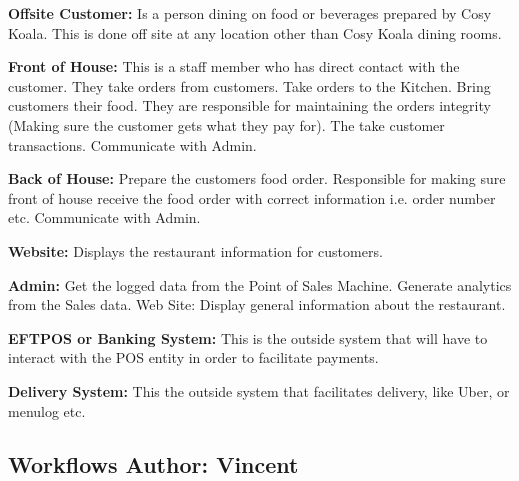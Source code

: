 \documentclass{article}
\begin{document}
\textbf{Offsite Customer:} Is a person dining on food or beverages prepared by Cosy Koala. This is done off site at any location other than Cosy Koala dining rooms.

\textbf{Front of House:} This is a staff member who has direct contact with the customer. They take orders from customers. Take orders to the Kitchen. Bring customers their food. They are responsible for maintaining the orders integrity (Making sure the customer gets what they pay for). The take customer transactions. Communicate with Admin.

\textbf{Back of House:} Prepare the customers food order. Responsible for making sure front of house receive the food order with correct information i.e. order number etc. Communicate with Admin.

\textbf{Website:} Displays the restaurant information for customers.

\textbf{Admin:} Get the logged data from the Point of Sales Machine.
Generate analytics from the Sales data.
Web Site: Display general information about the restaurant.

\textbf{EFTPOS or Banking System:} This is the outside system that will have to interact with the POS entity in order to facilitate payments.

\textbf{Delivery System:} This the outside system that facilitates delivery, like Uber, or menulog etc.


\clearpage
\subsection{Workflows \normalsize\textbf{Author: Vincent}}
\end{document}
